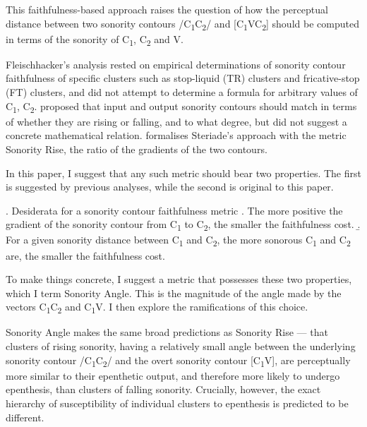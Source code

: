 \documentclass[12pt]{article}
\begin{document}
This faithfulness-based approach raises the question of how the perceptual distance between two sonority contours /C\textsubscript{1}C\textsubscript{2}/ and [C\textsubscript{1}VC\textsubscript{2}] should be computed in terms of the sonority of C\textsubscript{1}, C\textsubscript{2} and V.  

Fleischhacker's analysis rested on empirical determinations of sonority contour faithfulness of specific clusters such as stop-liquid (TR) clusters and fricative-stop (FT) clusters, and did not attempt to determine a formula for arbitrary values of C\textsubscript{1}, C\textsubscript{2}. \citet{steriade.2006} proposed that input and output sonority contours should match in terms of whether they are rising or falling, and to what degree, but did not suggest a concrete mathematical relation.  \citet{flemming.2008} formalises Steriade's approach with the metric {\sc Sonority Rise}, the ratio of the gradients of the two contours.

\bigskip

In this paper, I suggest that any such metric should bear two properties. The first is suggested by previous analyses, while the second is original to this paper.

\ex. Desiderata for a sonority contour faithfulness metric \label{desiderata}
     \a. The more positive the gradient of the sonority contour from C\textsubscript{1} to C\textsubscript{2}, the smaller the faithfulness cost. \label{desideratum_a}
     \b. For a given sonority distance between C\textsubscript{1} and C\textsubscript{2}, the more sonorous C\textsubscript{1} and C\textsubscript{2} are, the smaller the faithfulness cost. \label{desideratum_b}

To make things concrete, I suggest a metric that possesses these two properties, which I term {\sc Sonority Angle}. This is the magnitude of the angle made by the vectors C\textsubscript{1}C\textsubscript{2} and C\textsubscript{1}V. I then explore the ramifications of this choice. 

{\sc Sonority Angle} makes the same broad predictions as {\sc Sonority Rise} --- that clusters of rising sonority, having a relatively small angle between the underlying sonority contour /C\textsubscript{1}C\textsubscript{2}/ and the overt sonority contour [C\textsubscript{1}V], are perceptually more similar to their epenthetic output, and therefore more likely to undergo epenthesis, than clusters of falling sonority. Crucially, however, the exact hierarchy of susceptibility of individual clusters to epenthesis is predicted to be different.
\end{document}
